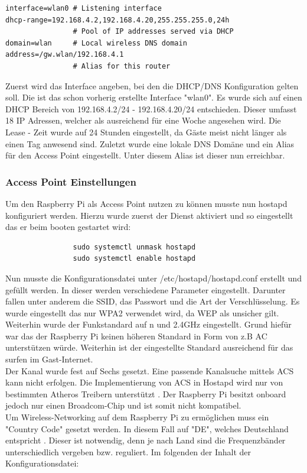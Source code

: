 \documentclass[a4paper,11pt,singlespacing]{article}
\begin{document}
            
                \begin{lstlisting}
interface=wlan0 # Listening interface
dhcp-range=192.168.4.2,192.168.4.20,255.255.255.0,24h
                # Pool of IP addresses served via DHCP
domain=wlan     # Local wireless DNS domain
address=/gw.wlan/192.168.4.1
                # Alias for this router
                \end{lstlisting}  
                Zuerst wird das Interface angeben, bei den die DHCP/DNS Konfiguration gelten soll. Die ist das schon vorherig erstellte Interface "wlan0". Es wurde sich auf einen DHCP Bereich von 192.168.4.2/24 - 192.168.4.20/24 entschieden. Dieser umfasst 18 IP Adressen, welcher als ausreichend für eine Woche angesehen wird. Die Lease - Zeit wurde auf 24 Stunden eingestellt, da Gäste meist nicht länger als einen Tag anwesend sind.
                Zuletzt wurde eine lokale DNS Domäne und ein Alias für den Access Point eingestellt. Unter diesem Alias ist dieser nun erreichbar.


            \subsubsection{Access Point Einstellungen}
                Um den Raspberry Pi als Access Point nutzen zu können musste nun hostapd konfiguriert werden. Hierzu wurde zuerst der Dienst aktiviert und so eingestellt das er beim booten gestartet wird:
                  \begin{lstlisting}
                sudo systemctl unmask hostapd
                sudo systemctl enable hostapd
                  \end{lstlisting} 
                
                    Nun musste die Konfigurationsdatei unter /etc/hostapd/hostapd.conf erstellt und gefüllt werden.
                    In dieser werden verschiedene Parameter eingestellt. Darunter fallen unter anderem die SSID, das Passwort und die Art der Verschlüsselung. Es wurde eingestellt das nur WPA2 verwendet wird, da WEP als unsicher gilt. Weiterhin wurde der Funkstandard auf n und 2.4GHz eingestellt. Grund hiefür war das der Raspberry Pi keinen höheren Standard in Form von z.B AC unterstützen würde. Weiterhin ist der eingestellte Standard ausreichend  für das surfen im Gast-Internet. \\
                    Der Kanal wurde fest auf Sechs gesetzt. Eine passende Kanalsuche mittels ACS kann nicht erfolgen. Die Implementierung von ACS in Hostapd wird nur von bestimmten Atheros Treibern unterstützt \cite{Quote_hostapdACS}. Der Raspberry Pi besitzt onboard jedoch nur einen Broadcom-Chip  \cite{Quote_Raspberrypi3b} und ist somit nicht kompatibel. \\
                    Um Wireless-Networking auf dem Raspberry Pi zu ermöglichen muss ein "Country Code" gesetzt werden. In diesem Fall auf "DE", welches Deutschland entspricht \cite{Quote_hostapdDE}. Dieser ist notwendig, denn je nach Land sind die Frequenzbänder unterschiedlich vergeben bzw. reguliert. Im folgenden der Inhalt der Konfigurationsdatei:
 
\end{document}
